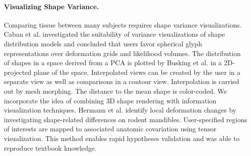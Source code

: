 \documentclass[journal]{style/vgtc} 			          %
\begin{document}
\paragraph{Visualizing Shape Variance.}
Comparing tissue between many subjects requires shape variance visualizations.
%
Caban et al. \cite{Caban2011} investigated the suitability of variance visualizations of shape distribution models and concluded that users favor spherical glyph representations over deformation grids and likelihood volumes.
%
The distribution of shapes in a space derived from a PCA is plotted by Busking et al. \cite{Busking2010a} in a 2D-projected plane of the space.
%
Interpolated views can be created by the user in a separate view as well as comparisons in a contour view.
%
Interpolation is carried out by mesh morphing.
%
The distance to the mean shape is color-coded.
%
We incorporate the idea of combining 3D shape rendering with information visualization techniques.
%
%
%
Hermann et al. \cite{Hermann2014} identify local deformation changes by investigating shape-related differences on rodent mandibles.
%
User-specified regions of interests are mapped to associated anatomic covariation using tensor visualization.
%
This method enables rapid hypotheses validation and was able to reproduce textbook knowledge.
%
%
%

\end{document}
